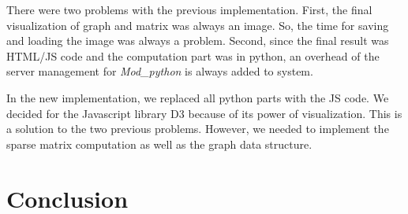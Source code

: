 \documentclass[12pt, oneside]{book}
\begin{document}
There were two problems with the previous implementation. First, the final visualization
of graph and matrix was always an image. 
So, the time for saving and loading the image was always a problem.
Second, since the final result was HTML/JS code and the computation part was in python,
an overhead of the server management for \textit{Mod\_python} is always added to system.

In the new implementation, we replaced all python parts with the JS code.
We decided for the Javascript library D3 because of its power of visualization.
This is a solution to the two previous problems. However, we needed to implement 
the sparse matrix computation as well as the graph data structure.

\chapter{Conclusion}
 


\end{document}
